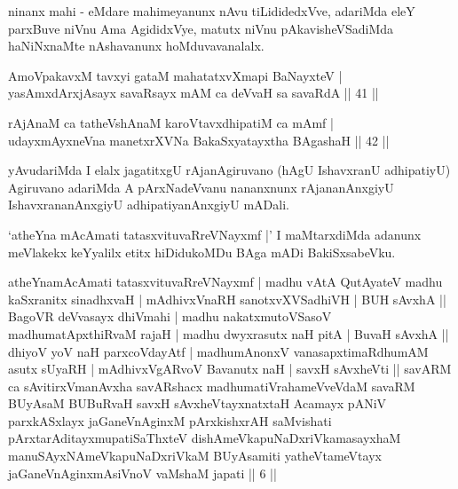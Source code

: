 \begin{artha}
ninanx mahi - eMdare mahimeyanunx nAvu tiLididedxVve, adariMda eleY parxBuve niVnu Ama AgididxVye, matutx niVnu pAkavisheVSadiMda haNiNxnaMte nAshavanunx hoMduvavanalalx.
\end{artha}

\begin{shl}
AmoV\s pakavxM tavxyi gataM mahatatxvXmapi BaNayxteV | \\
yasAmxdArxjA\s sayx savaRsayx mAM ca deVvaH sa savaRdA \hfill|| 41 || 
\end{shl}

\begin{shl}
rAjAnaM ca tatheVshAnaM karoVtavxdhipatiM ca mAmf | \\
udayxmAyxneVna manetxrXVNa BakaSxyatayxtha BAgashaH \hfill|| 42 || 
\end{shl}

\begin{artha}
yAvudariMda I elalx jagatitxgU rAjanAgiruvano (hAgU IshavxranU adhipatiyU) Agiruvano adariMda A pArxNadeVvanu nananxnunx rAjananAnxgiyU IshavxrananAnxgiyU adhipatiyanAnxgiyU mADali.
\end{artha}

\begin{artha}
`atheYna mAcAmati tatasxvituvaRreVNayxmf |' I maMtarxdiMda adanunx meVlakekx keYyalilx etitx hiDidukoMDu BAga mADi BakiSxsabeVku.
\end{artha}


\begin{kandikeshl}
atheYnamAcAmati tatasxvituvaRreVNayxmf | madhu vAtA QutAyateV madhu kaSxranitx sinadhxvaH | mAdhivxVnaRH sanotxvXVSadhiVH | BUH sAvxhA || BagoVR deVvasayx dhiVmahi | madhu nakatxmutoVSasoV madhumatApxthiRvaM rajaH | madhu dwyxrasutx naH pitA | BuvaH sAvxhA || dhiyoV yoV naH parxcoVdayAtf | madhumAnonxV vanasapxtimaRdhumAM asutx sUyaRH | mAdhivxVgARvoV Bavanutx naH | savxH sAvxheVti || savARM ca sAvitirxVmanAvxha savARshacx madhumatiVrahameVveVdaM savaRM BUyAsaM BUBuRvaH savxH sAvxheVtayxnatxtaH Acamayx pANiV parxkASxlayx jaGaneVnAginxM pArxkishxrAH saMvishati pArxtarAditayxmupatiSaThxteV dishAmeVkapuNaDxriVkamasayxhaM manuSAyxNAmeVkapuNaDxriVkaM BUyAsamiti yatheVtameVtayx jaGaneVnAginxmAsiVnoV vaMshaM japati || 6 ||
\end{kandikeshl}	



